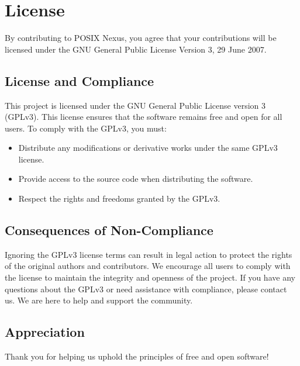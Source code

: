 \newpage
\section{License}
By contributing to POSIX Nexus, you agree that your contributions will be licensed under the GNU General Public License Version 3, 29 June 2007.

\subsection{License and Compliance}

This project is licensed under the GNU General Public License version 3 (GPLv3). This license ensures that the software remains free and open for all users. To comply with the GPLv3, you must:

\begin{itemize} 
    \item Distribute any modifications or derivative works under the same GPLv3 license.
    \item Provide access to the source code when distributing the software.
    \item Respect the rights and freedoms granted by the GPLv3.
\end{itemize}

\subsection{Consequences of Non-Compliance}
Ignoring the GPLv3 license terms can result in legal action to protect the rights of the original authors and contributors. We encourage all users to comply with the license to maintain the integrity and openness of the project. If you have any questions about the GPLv3 or need assistance with compliance, please contact us. We are here to help and support the community.

\subsection{Appreciation}
Thank you for helping us uphold the principles of free and open software!